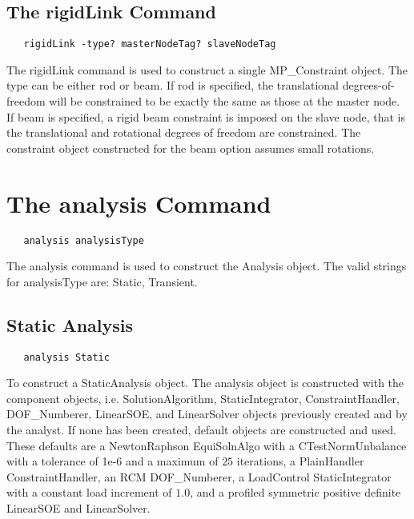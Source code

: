 \documentclass[12pt]{article}
\begin{document}
\subsection{The rigidLink Command}
{\sf\small
\begin{verbatim}
   rigidLink -type? masterNodeTag? slaveNodeTag
\end{verbatim}
}

The rigidLink command is used to construct a single MP\_Constraint object.
The type can be either rod or beam. If rod is specified, the
translational degrees-of-freedom will be constrained to be exactly the
same as those at the master node. If beam is specified, a rigid beam
constraint is imposed on the slave node, that is the translational and
rotational degrees of freedom are constrained. The constraint object
constructed for the beam option assumes small rotations.

\section {The analysis Command}

{\sf\small
\begin{verbatim}
   analysis analysisType 
\end{verbatim}
}

The analysis command is used to construct the Analysis object.
The valid strings for analysisType are: Static, Transient. 

\subsection{Static Analysis}

{\sf\small
\begin{verbatim}
   analysis Static 
\end{verbatim}
}

To construct a StaticAnalysis object. The analysis object is
constructed with the component objects, i.e. SolutionAlgorithm, StaticIntegrator,
ConstraintHandler, DOF\_Numberer, LinearSOE, and LinearSolver objects
previously created and by the analyst. If none has been created,
default objects are constructed and used. These defaults are a
NewtonRaphson EquiSolnAlgo with a CTestNormUnbalance with a tolerance
of 1e-6 and a maximum of $25$ iterations, a PlainHandler
ConstraintHandler, an RCM DOF\_Numberer, a LoadControl
StaticIntegrator with a constant load increment of $1.0$, and a
profiled symmetric positive definite LinearSOE and LinearSolver.
\end{document}
